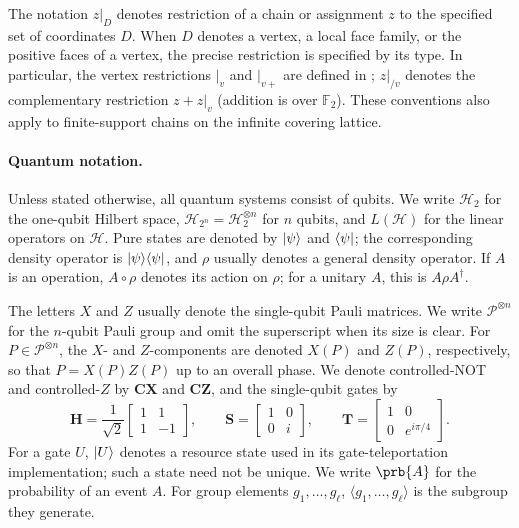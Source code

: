 The notation $z|_D$ denotes restriction of a chain or assignment $z$ to the specified set of coordinates $D$. When $D$ denotes a vertex, a local face family, or the positive faces of a vertex, the precise restriction is specified by its type. In particular, the vertex restrictions $|_v$ and $|_{v+}$ are defined in ; $z|_{/v}$ denotes the complementary restriction $z+z|_v$ (addition is over $\mathbb F_2$). These conventions also apply to finite-support chains on the infinite covering lattice.

\paragraph{Quantum notation.}
Unless stated otherwise, all quantum systems consist of qubits. We write $\mathcal H_2$ for the one-qubit Hilbert space, $\mathcal H_{2^n}=\mathcal H_2^{\otimes n}$ for $n$ qubits, and $L(\mathcal H)$ for the linear operators on $\mathcal H$. Pure states are denoted by $\ket\psi$ and $\bra\psi$; the corresponding density operator is $\ket\psi\!\bra\psi$, and $\rho$ usually denotes a general density operator. If $A$ is an operation, $A\circ\rho$ denotes its action on $\rho$; for a unitary $A$, this is $A\rho A^\dagger$.

The letters $X$ and $Z$ usually denote the single-qubit Pauli matrices. We write $\mathcal P^{\otimes n}$ for the $n$-qubit Pauli group and omit the superscript when its size is clear. For $P\in\mathcal P^{\otimes n}$, the $X$- and $Z$-components are denoted $X(P)$ and $Z(P)$, respectively, so that $P=X(P)Z(P)$ up to an overall phase. We denote controlled-NOT and controlled-$Z$ by $\mathbf{CX}$ and $\mathbf{CZ}$, and the single-qubit gates by
\begin{equation*}
 \mathbf H=\frac{1}{\sqrt 2}\begin{bmatrix}1&1\\1&-1\end{bmatrix},\qquad
 \mathbf S=\begin{bmatrix}1&0\\0&i\end{bmatrix},\qquad
 \mathbf T=\begin{bmatrix}1&0\\0&e^{i\pi/4}\end{bmatrix}.
\end{equation*}
For a gate $U$, $\ket U$ denotes a resource state used in its gate-teleportation implementation; such a state need not be unique. We write $\prb{A}$ for the probability of an event $A$. For group elements $g_1,\ldots,g_\ell$, $\langle g_1,\ldots,g_\ell\rangle$ is the subgroup they generate.

